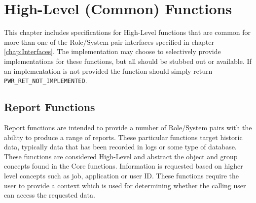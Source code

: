 \documentclass[12pt]{report} %
\providecommand{\DIFdelend}{} %
\DeclareRobustCommand{\DIFdelend}{\DIFOaddend \let\includegraphics\DIFOincludegraphics} %
\begin{document}
\DIFdelend \chapter{High-Level (Common) Functions}\label{chap:HighLevel}

This chapter includes specifications for High-Level functions that are common for more than one of the Role/System pair interfaces specified in chapter \ref{chap:Interfaces}.
The implementation may choose to selectively provide implementations for these functions, but all should be stubbed out or available.
If an implementation is not provided the function should simply return \texttt{PWR_RET_NOT_IMPLEMENTED}.  



\section{Report Functions}\label{sec:ReportFunctions}

Report functions are intended to provide a number of Role/System pairs with the ability to produce a range of reports.
These particular functions target historic data, typically data that has been recorded in logs or some type of database.
These functions are considered High-Level and abstract the object and group concepts found in the Core functions.
Information is requested based on higher level concepts such as job, application or user ID.
These functions require the user to provide a context which is used for determining whether the calling user can access the requested data.
\end{document}
